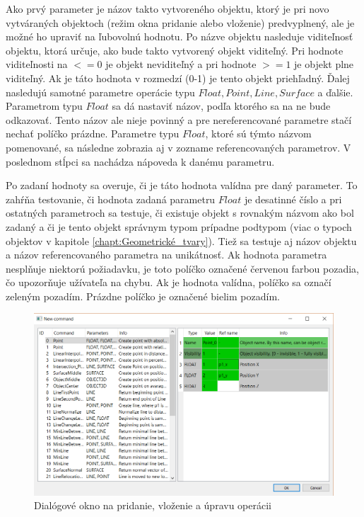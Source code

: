 Ako prvý parameter je názov takto vytvoreného objektu, ktorý je pri novo vytváraných objektoch (režim okna pridanie alebo vloženie) predvyplnený, ale je možné ho upraviť na ľubovolnú hodnotu.  
Po názve objektu nasleduje viditeľnosť objektu, ktorá určuje, ako bude takto vytvorený objekt viditeľný. Pri hodnote viditeľnosti na $<=0$ je objekt neviditeľný a pri hodnote $>=1$ je objekt plne viditeľný. Ak je táto hodnota v rozmedzí (0-1) je tento objekt priehľadný. 
Ďalej nasledujú samotné parametre operácie typu $Float,  Point, Line, Surface$ a ďalšie. Parametrom typu $Float$ sa dá nastaviť názov, podľa ktorého sa na ne bude odkazovať. Tento názov ale nieje povinný a pre nereferencované parametre stačí nechať políčko prázdne. Parametre typu $Float$, ktoré sú týmto názvom pomenované, sa následne zobrazia aj v zozname referencovaných parametrov.
V poslednom stĺpci sa nachádza nápoveda k danému parametru.

Po zadaní hodnoty sa overuje, či je táto hodnota valídna pre daný parameter. To zahŕňa testovanie, či hodnota zadaná parametru $Float$ je desatinné číslo a pri ostatných parametroch sa testuje, či existuje objekt s rovnakým názvom ako bol zadaný a či je tento objekt správnym typom prípadne podtypom (viac o typoch objektov v kapitole  \ref{chapt:Geometrické_tvary}). Tiež sa testuje aj názov objektu a názov referencovaného parametra na unikátnosť.
Ak hodnota parametra nesplňuje niektorú požiadavku, je toto políčko označené červenou farbou pozadia, čo upozorňuje užívateľa na chybu. Ak je hodnota valídna, políčko sa označí zeleným pozadím. Prázdne políčko je označené bielim pozadím. 

\begin{figure}[hbt]
	\centering
	\includegraphics[width=1\textwidth]{obrazky-figures/Dialog.png}
	\caption{Dialógové okno na pridanie, vloženie a úpravu operácii}
	\label{fig:dialogWindow}
\end{figure}

